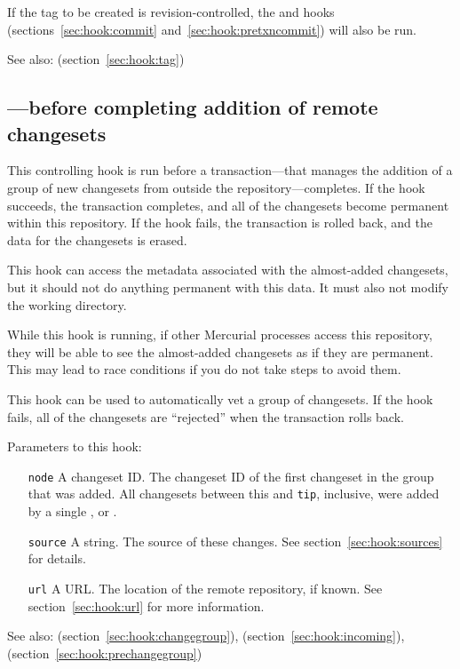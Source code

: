 If the tag to be created is revision-controlled, the 
and  hooks (sections~\ref{sec:hook:commit}
and~\ref{sec:hook:pretxncommit}) will also be run.

See also:  (section~\ref{sec:hook:tag})

\subsection{---before completing addition of
  remote changesets}
\label{sec:hook:pretxnchangegroup}

This controlling hook is run before a transaction---that manages the
addition of a group of new changesets from outside the
repository---completes.  If the hook succeeds, the transaction
completes, and all of the changesets become permanent within this
repository.  If the hook fails, the transaction is rolled back, and
the data for the changesets is erased.

This hook can access the metadata associated with the almost-added
changesets, but it should not do anything permanent with this data.
It must also not modify the working directory.

While this hook is running, if other Mercurial processes access this
repository, they will be able to see the almost-added changesets as if
they are permanent.  This may lead to race conditions if you do not
take steps to avoid them.

This hook can be used to automatically vet a group of changesets.  If
the hook fails, all of the changesets are ``rejected'' when the
transaction rolls back.

Parameters to this hook:
\begin{itemize}
\item[\texttt{node}] A changeset ID.  The changeset ID of the first
  changeset in the group that was added.  All changesets between this
  and \texttt{tip}, inclusive, were added by
  a single ,  or .
\item[\texttt{source}] A string.  The source of these changes.  See
  section~\ref{sec:hook:sources} for details.
\item[\texttt{url}] A URL.  The location of the remote repository, if
  known.  See section~\ref{sec:hook:url} for more information.
\end{itemize}

See also:  (section~\ref{sec:hook:changegroup}),
 (section~\ref{sec:hook:incoming}),
 (section~\ref{sec:hook:prechangegroup})

